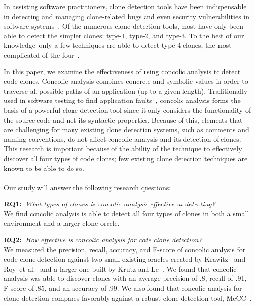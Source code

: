 \documentclass{sig-alternate}
\begin{document}
In assisting software practitioners, clone detection tools have been indispensable in detecting and managing clone-related bugs and even security vulnerabilities in software systems~\cite{Dang:2012:XTC:2420950.2421004}. Of the numerous clone detection tools, most have only been able to detect the simpler clones: type-1, type-2, and type-3. To the best of our knowledge, only a few techniques are able to detect type-4 clones, the most complicated of the four~\cite{Roy:2009:CEC:1530898.1531101}.



In this paper, we examine the effectiveness of using concolic analysis to detect code clones. Concolic analysis combines concrete and symbolic values in order to traverse all possible paths of an application (up to a given length). Traditionally used in software testing to find application faults~\cite{Sen:2005:CCU:1081706.1081750}, concolic analysis forms the basis of a powerful clone detection tool since it only considers the functionality of the source code and not its syntactic properties. Because of this, elements that are challenging for many existing clone detection systems, such as comments and naming conventions, do not affect concolic analysis and its detection of clones. This research is important because of the ability of the technique to effectively discover all four types of code clones; few existing clone detection techniques are known to be able to do so. \\ \\ Our study will answer the following research questions:

\textbf{RQ1:}~\emph{What types of clones is concolic analysis effective at detecting?}\\
We find concolic analysis is able to detect all four types of clones in both a small environment and a larger clone oracle.

\textbf{RQ2:}~\emph{How effective is concolic analysis for code clone detection?}\\
We measured the precision, recall, accuracy, and F-score of concolic analysis for code clone detection against two small existing oracles created by Krawitz~\cite{Kraw2012} and Roy~et al.~\cite{Roy:2009:CEC:1530898.1531101} and a larger one built by Krutz and Le~\cite{Krutz:2014:CCO:2597073.2597127}. We found that concolic analysis was able to discover clones with an average precision of .8, recall of .91, F-score of .85, and an accuracy of .99. We also found that concolic analysis for clone detection compares favorably against a robust clone detection tool, MeCC~\cite{Kim:2011:MMC:1985793.1985835}.
\end{document}
